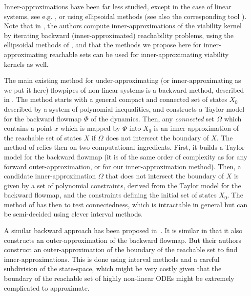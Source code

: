 \documentclass{sig-alternate-05-2015}
\begin{document}
Inner-approximations have been far less studied, except in the case of linear systems, 
see e.g. \cite{LeGuernic09,GirardLinear06}, or using ellipsoidal methods
\cite{kurzhanski2000ellipsoidal} (see also the corresponding tool \cite{ellipsoidaltoolbox}).
Note that in \cite{kaynama2012computing}, the authors compute inner-approximations
of the viability kernel by iterating backward (inner-approxima\-ted) reachability 
problems, using the ellipsoidal methods of \cite{kurzhanski2000ellipsoidal}, and
that the methods we propose here for inner-approximating reachable sets 
can be used for inner-approxi\-mating viability kernels as well. 

The main existing method for under-approximating (or inner-approximating as we put it 
here) flowpipes of non-linear systems is a backward method, described in \cite{Underapproxflowpipes}. 
The method starts with a general
compact and connected 
set of states $X_0$ described by a system of polynomial inequalities, and constructs a Taylor
model for the backward flowmap $\Phi$ of the dynamics. Then, any {\em connected} set $\Omega$
which contains a point 
$x$ which is mapped by $\Phi$ into $X_0$ is an inner-approximation of the reachable set
of states $X$ if $\Omega$ does not intersect the boundary of 
$X$. The method of \cite{Underapproxflowpipes}
relies then on two computational ingredients. 
First, it builds a Taylor model for the backward flowmap (it is of the same order of complexity
as for any forward outer-approximation, or for our inner-approximation method). 
Then, a candidate inner-approximation $\Omega$ that does not intersect the boundary of $X$
is given by a set of polynomial constraints, derived
from the Taylor model for the backward flowmap, and the constraints defining the initial set
of states $X_0$. The method of \cite{Underapproxflowpipes} has then to test connectedness, which is intractable in general but
can be semi-decided using clever interval methods.

A similar backward approach %
has been proposed in~\cite{underapprox16}. It is similar in that it also constructs 
an outer-approximation of the backward flowmap. But their authors construct an outer-approximation
of the boundary of the reachable set to find inner-approximations. This is done using 
interval methods and a careful subdivision of the state-space, which might be very costly
given that the boundary of the reachable set of highly non-linear ODEs might be extremely 
complicated to approximate. 
\end{document}
